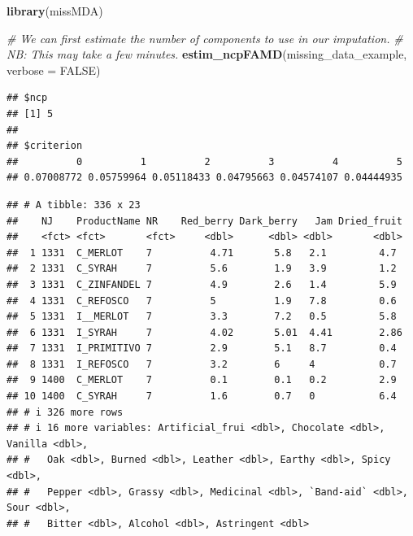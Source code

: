 \documentclass[
]{book}
\newenvironment{Shaded}{\begin{snugshade}}{\end{snugshade}}
\newcommand{\AttributeTok}[1]{\textcolor[rgb]{0.13,0.29,0.53}{#1}}
\newcommand{\CommentTok}[1]{\textcolor[rgb]{0.56,0.35,0.01}{\textit{#1}}}
\newcommand{\ConstantTok}[1]{\textcolor[rgb]{0.56,0.35,0.01}{#1}}
\newcommand{\DecValTok}[1]{\textcolor[rgb]{0.00,0.00,0.81}{#1}}
\newcommand{\FunctionTok}[1]{\textcolor[rgb]{0.13,0.29,0.53}{\textbf{#1}}}
\newcommand{\NormalTok}[1]{#1}
\newcommand{\OtherTok}[1]{\textcolor[rgb]{0.56,0.35,0.01}{#1}}
\newcommand{\SpecialCharTok}[1]{\textcolor[rgb]{0.81,0.36,0.00}{\textbf{#1}}}
\begin{document}
\begin{Shaded}
\begin{Highlighting}[]
\FunctionTok{library}\NormalTok{(missMDA)}

\CommentTok{\# We can first estimate the number of components to use in our imputation.}
\CommentTok{\# NB: This may take a few minutes.}
\FunctionTok{estim\_ncpFAMD}\NormalTok{(missing\_data\_example, }\AttributeTok{verbose =} \ConstantTok{FALSE}\NormalTok{)}
\end{Highlighting}
\end{Shaded}

\begin{verbatim}
## $ncp
## [1] 5
## 
## $criterion
##          0          1          2          3          4          5 
## 0.07008772 0.05759964 0.05118433 0.04795663 0.04574107 0.04444935
\end{verbatim}

\begin{Shaded}
\end{Shaded}

\begin{verbatim}
## # A tibble: 336 x 23
##    NJ    ProductName NR    Red_berry Dark_berry   Jam Dried_fruit
##    <fct> <fct>       <fct>     <dbl>      <dbl> <dbl>       <dbl>
##  1 1331  C_MERLOT    7          4.71       5.8   2.1         4.7 
##  2 1331  C_SYRAH     7          5.6        1.9   3.9         1.2 
##  3 1331  C_ZINFANDEL 7          4.9        2.6   1.4         5.9 
##  4 1331  C_REFOSCO   7          5          1.9   7.8         0.6 
##  5 1331  I__MERLOT   7          3.3        7.2   0.5         5.8 
##  6 1331  I_SYRAH     7          4.02       5.01  4.41        2.86
##  7 1331  I_PRIMITIVO 7          2.9        5.1   8.7         0.4 
##  8 1331  I_REFOSCO   7          3.2        6     4           0.7 
##  9 1400  C_MERLOT    7          0.1        0.1   0.2         2.9 
## 10 1400  C_SYRAH     7          1.6        0.7   0           6.4 
## # i 326 more rows
## # i 16 more variables: Artificial_frui <dbl>, Chocolate <dbl>, Vanilla <dbl>,
## #   Oak <dbl>, Burned <dbl>, Leather <dbl>, Earthy <dbl>, Spicy <dbl>,
## #   Pepper <dbl>, Grassy <dbl>, Medicinal <dbl>, `Band-aid` <dbl>, Sour <dbl>,
## #   Bitter <dbl>, Alcohol <dbl>, Astringent <dbl>
\end{verbatim}
\end{document}
